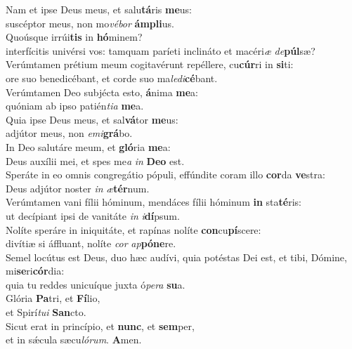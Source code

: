 \evenverse Nam et ipse Deus meus, et salu\textbf{tá}ris \textbf{me}us:~\*\\
\evenverse suscéptor meus, non mo\textit{vé}\textit{bor} \textbf{ám}\textbf{pli}us.\\
\oddverse Quoúsque irrúi\textbf{tis} in \textbf{hó}minem?~\*\\
\oddverse interfícitis univérsi vos: tamquam paríeti inclináto et macéri\textit{æ} \textit{de}\textbf{púl}sæ?\\
\evenverse Verúmtamen prétium meum cogitavérunt repéllere, cu\textbf{cúr}ri in \textbf{si}ti:~\*\\
\evenverse ore suo benedicébant, et corde suo ma\textit{le}\textit{di}\textbf{cé}bant.\\
\oddverse Verúmtamen Deo subjécta esto, \textbf{á}nima \textbf{me}a:~\*\\
\oddverse quóniam ab ipso patién\textit{ti}\textit{a} \textbf{me}a.\\
\evenverse Quia ipse Deus meus, et sal\textbf{vá}tor \textbf{me}us:~\*\\
\evenverse adjútor meus, non \textit{e}\textit{mi}\textbf{grá}bo.\\
\oddverse In Deo salutáre meum, et \textbf{gló}ria \textbf{me}a:~\*\\
\oddverse Deus auxílii mei, et spes me\textit{a} \textit{in} \textbf{De}\textbf{o} est.\\
\evenverse Speráte in eo omnis congregátio pópuli, effúndite coram illo \textbf{cor}da \textbf{ve}stra:~\*\\
\evenverse Deus adjútor noster \textit{in} \textit{æ}\textbf{tér}num.\\
\oddverse Verúmtamen vani fílii hóminum, mendáces fílii hóminum \textbf{in} sta\textbf{té}ris:~\*\\
\oddverse ut decípiant ipsi de vanitáte \textit{in} \textit{i}\textbf{dí}psum.\\
\evenverse Nolíte speráre in iniquitáte, et rapínas nolíte \textbf{con}cu\textbf{pí}scere:~\*\\
\evenverse divítiæ si áffluant, nolíte \textit{cor} \textit{ap}\textbf{pó}\textbf{ne}re.\\
\oddverse Semel locútus est Deus, duo hæc audívi, quia potéstas Dei est, et tibi, Dómine, mi\textbf{se}ri\textbf{cór}dia:~\*\\
\oddverse quia tu reddes unicuíque juxta ó\textit{pe}\textit{ra} \textbf{su}a.\\
\evenverse Glória \textbf{Pa}tri, et \textbf{Fí}lio,~\*\\
\evenverse et Spirí\textit{tu}\textit{i} \textbf{San}cto.\\
\oddverse Sicut erat in princípio, et \textbf{nunc}, et \textbf{sem}per,~\*\\
\oddverse et in sǽcula sæcu\textit{ló}\textit{rum}. \textbf{A}men.\\
